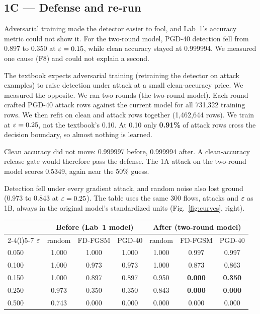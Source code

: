 \subsection{1C --- Defense and re-run}

 Adversarial training made the detector easier to fool, and Lab~1's accuracy metric could not show it. For the two-round model, PGD-40 detection fell from 0.897 to 0.350 at $\varepsilon=0.15$, while clean accuracy stayed at 0.999994. We measured one cause (F8) and could not explain a second.

 The textbook expects adversarial training (retraining the detector on attack examples) to raise detection under attack at a small clean-accuracy price. We measured the opposite. We ran two rounds (the two-round model). Each round crafted PGD-40 attack rows against the current model for all 731{,}322 training rows. We then refit on clean and attack rows together (1{,}462{,}644 rows). We train at $\varepsilon=0.25$, not the textbook's 0.10. At 0.10 only \textbf{0.91\%} of attack rows cross the decision boundary, so almost nothing is learned.

 Clean accuracy did not move: 0.999997 before, 0.999994 after. A clean-accuracy release gate would therefore pass the defense. The 1A attack on the two-round model scores 0.5349, again near the 50\% guess.

 Detection fell under every gradient attack, and random noise also lost ground (0.973 to 0.843 at $\varepsilon=0.25$). The table uses the same 300 flows, attacks and $\varepsilon$ as 1B, always in the original model's standardized units (Fig.~\ref{fig:curves}, right).

\begin{center}\small
\begin{tabular}{@{}lccc@{\hskip 8pt}ccc@{}}
\toprule
& \multicolumn{3}{c}{\textbf{Before (Lab~1 model)}} & \multicolumn{3}{c}{\textbf{After (two-round model)}} \\
\cmidrule(r){2-4}\cmidrule(l){5-7}
$\varepsilon$ & random & FD-FGSM & PGD-40 & random & FD-FGSM & PGD-40 \\
\midrule
0.050 & 1.000 & 1.000 & 1.000 & 1.000 & 0.997 & 0.997 \\
0.100 & 1.000 & 0.973 & 0.973 & 1.000 & 0.873 & 0.863 \\
0.150 & 1.000 & 0.897 & 0.897 & 0.950 & \textbf{0.000} & \textbf{0.350} \\
0.250 & 0.973 & 0.350 & 0.350 & 0.843 & \textbf{0.000} & \textbf{0.000} \\
0.500 & 0.743 & 0.000 & 0.000 & 0.000 & 0.000 & 0.000 \\
\bottomrule
\end{tabular}
\end{center}

